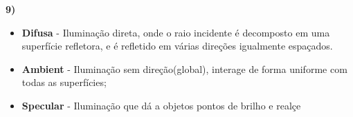 \textbf{9)} 

\begin{itemize}
    \item \textbf{Difusa} - Iluminação direta, onde o raio incidente é decomposto 
    em uma superfície refletora, e é refletido em várias direções igualmente espaçados.
    \item \textbf{Ambient} - Iluminação sem direção(global), interage de forma uniforme 
    com todas as superfícies;
    \item \textbf{Specular} - Iluminação que dá a objetos pontos de brilho e realçe 
\end{itemize}
~